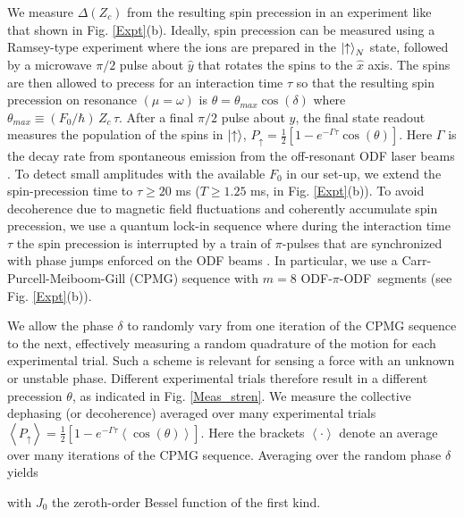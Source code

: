 \documentclass[aps,prl,twocolumn,superscriptaddress,floatfix]{revtex4-1}
\begin{document}
We measure $\Delta(Z_c)$ from the resulting spin precession in an experiment like that shown in Fig. \ref{Expt}(b). Ideally, spin precession can be measured using a Ramsey-type experiment where the ions are prepared in the $\ket{\uparrow}_N$ state, followed by a microwave $\pi/2$ pulse about $\hat{y}$ that rotates the spins to the $\hat{x}$ axis. The spins are then allowed to precess for an interaction time $\tau$ so that the resulting spin precession on resonance $(\mu = \omega)$ is $\theta = \theta_{max} \cos(\delta)$ where $\theta_{max} \equiv (F_{0}/\hbar)\, Z_c \, \tau$. After a final $\pi/2$ pulse about $\hat{y}$, the final state readout measures the population of the spins in $\ket{\uparrow}$, $P_{\uparrow} = \frac{1}{2}[1-e^{-\Gamma \tau}\cos(\theta)]$. Here $\Gamma$ is the decay rate from spontaneous emission from the off-resonant ODF laser beams . To detect small amplitudes with the available $F_0$ in our set-up, we extend the spin-precession time to $\tau \ge 20$ ms ($T \ge 1.25$ ms, in Fig. \ref{Expt}(b)). To avoid decoherence due to magnetic field fluctuations and coherently accumulate spin precession, we use a quantum lock-in  sequence where during the interaction time $\tau$ the spin precession is interrupted by a train of $\pi$-pulses that are synchronized with phase jumps enforced on the ODF beams . In particular, we use a Carr-Purcell-Meiboom-Gill (CPMG) sequence with $m = 8$ \mbox{ODF-$\pi$-ODF segments} (see Fig. \ref{Expt}(b)).

We allow the phase $\delta$ to randomly vary from one iteration of the CPMG sequence to the next, effectively measuring a random quadrature of the motion for each experimental trial. Such a scheme is relevant for sensing a force with an unknown or unstable phase. Different experimental trials therefore result in a different precession $\theta$, as indicated in Fig. \ref{Meas_stren}. We measure the collective dephasing (or decoherence) averaged over many experimental trials $\left< P_{\uparrow} \right> = \frac{1}{2}[1-e^{-\Gamma \tau} \left<\cos(\theta)\right>]$. Here the brackets $ \left< \cdot \right> $ denote an average over many iterations of the CPMG sequence. Averaging over the random phase $\delta$ yields~

with $J_0$ the zeroth-order Bessel function of the first kind.
\end{document}
